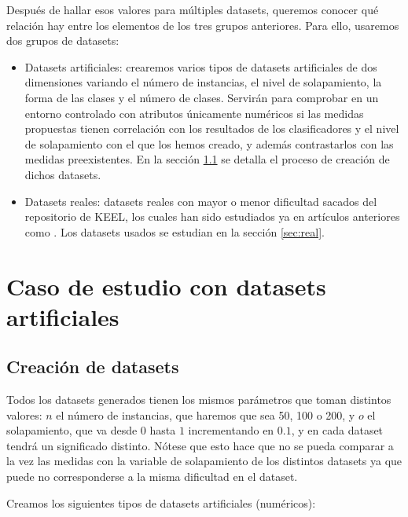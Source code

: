 \documentclass[a4paper,12pt]{report}
\theoremstyle{definition}
\begin{document}
Después de hallar esos valores para múltiples datasets, queremos conocer qué relación hay entre los elementos de los tres grupos anteriores.
Para ello, usaremos dos grupos de datasets:
\begin{itemize}
\item Datasets artificiales: crearemos varios tipos de datasets artificiales de dos dimensiones variando el número de instancias, el nivel de solapamiento, la forma de las clases y el número de clases. Servirán para comprobar en un entorno controlado con atributos únicamente numéricos si las medidas propuestas tienen correlación con los resultados de los clasificadores y el nivel de solapamiento con el que los hemos creado, y además contrastarlos con las medidas preexistentes. En la sección \ref{subsec:generate} se detalla el proceso de creación de dichos datasets.
\item Datasets reales: datasets reales con mayor o menor dificultad sacados del repositorio de KEEL\cite{alcala2011keel}, los cuales han sido estudiados ya en artículos anteriores como \cite{garcia2009diagnose}. Los datasets usados se estudian en la sección \ref{sec:real}.
\end{itemize}

\section{Caso de estudio con datasets artificiales}
\label{sec:artificial}

\subsection{Creación de datasets}
\label{subsec:generate}
Todos los datasets generados tienen los mismos parámetros que toman distintos valores: $n$ el número de instancias, que haremos que sea 50, 100 o 200, y $o$ el solapamiento, que va desde $0$ hasta $1$ incrementando en $0.1$, y en cada dataset tendrá un significado distinto. Nótese que esto hace que no se pueda comparar a la vez las medidas con la variable de solapamiento de los distintos datasets ya que puede no corresponderse a la misma dificultad en el dataset.

Creamos los siguientes tipos de datasets artificiales (numéricos):
\end{document}
